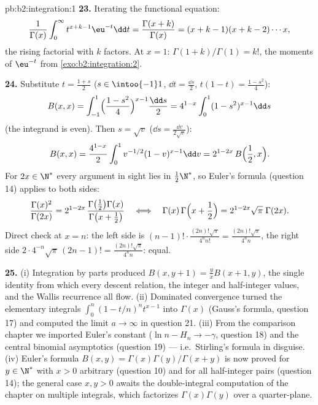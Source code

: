 \begin{solution}{pb:b2:integration:1}
\textbf{23.} Iterating the functional equation:
\[
\frac{1}{\Gamma(x)}\int_0^\infty t^{x+k-1}\eu^{-t}\dd t
= \frac{\Gamma(x+k)}{\Gamma(x)}
= (x+k-1)(x+k-2)\cdots x ,
\]
the rising factorial with $k$ factors. At $x = 1$:
$\Gamma(1+k)/\Gamma(1) = k!$, the moments of $\eu^{-t}$ from
\cref{exo:b2:integration:2}.

\textbf{24.} Substitute $t = \frac{1+s}2$ ($s \in
\intoo{-1}1$, $\dd t = \frac{\dd s}2$, $t(1-t) =
\frac{1-s^2}4$):
\[
B(x,x) = \int_{-1}^{1}\Bigl(\frac{1-s^2}{4}\Bigr)^{x-1}
\frac{\dd s}{2}
= 4^{1-x}\int_0^1 (1-s^2)^{x-1}\dd s
\]
(the integrand is even). Then $s = \sqrt v$ ($\dd s =
\frac{\dd v}{2\sqrt v}$):
\[
B(x,x) = \frac{4^{1-x}}{2}\int_0^1
v^{-1/2}(1-v)^{x-1}\dd v
= 2^{1-2x}\,B\Bigl(\frac12, x\Bigr) .
\]
For $2x \in \N^*$ every argument in sight lies in
$\frac12\N^*$, so Euler's formula (question 14) applies to both
sides:
\[
\frac{\Gamma(x)^2}{\Gamma(2x)}
= 2^{1-2x}\,
\frac{\Gamma\bigl(\frac12\bigr)\Gamma(x)}
{\Gamma\bigl(x+\frac12\bigr)}
\quad\Longleftrightarrow\quad
\Gamma(x)\,\Gamma\Bigl(x+\frac12\Bigr)
= 2^{1-2x}\sqrt\pi\;\Gamma(2x) .
\]
Direct check at $x = n$: the left side is $(n-1)!\cdot
\frac{(2n)!\sqrt\pi}{4^n n!} = \frac{(2n)!\sqrt\pi}{4^n n}$,
the right side $2\cdot4^{-n}\sqrt\pi\,(2n-1)! =
\frac{(2n)!\sqrt\pi}{4^n n}$: equal.

\textbf{25.} (i) Integration by parts produced $B(x,y+1) =
\frac yx B(x+1,y)$, the single identity from which every
descent relation, the integer and half-integer values, and the
Wallis recurrence all flow. (ii) Dominated convergence turned
the elementary integrals $\int_0^n(1-t/n)^n t^{x-1}$ into
$\Gamma(x)$ (Gauss's formula, question 17) and computed the
limit $a \to \infty$ in question 21. (iii) From the comparison
chapter we imported Euler's constant ($\ln n - H_n \to
-\gamma$, question 18) and the central binomial asymptotics
(question 19) --- i.e.\ Stirling's formula in disguise. (iv)
Euler's formula $B(x,y) = \Gamma(x)\Gamma(y)/\Gamma(x+y)$ is
now proved for $y \in \N^*$ with $x > 0$ arbitrary (question
10) and for all half-integer pairs (question 14); the general
case $x, y > 0$ awaits the double-integral computation of the
chapter on multiple integrals, which factorizes
$\Gamma(x)\Gamma(y)$ over a quarter-plane.
\end{solution}
